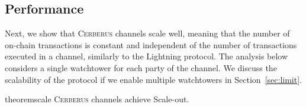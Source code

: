 \documentclass[runningheads]{llncs}
\newcommand{\sys}{\textsc{Cerberus}\xspace}
\begin{document}
\subsection{Performance}

Next, we show that \sys channels scale well, meaning that the number of on-chain transactions is constant and independent of the number of transactions executed in a channel, similarly to the Lightning protocol. The analysis below considers a single watchtower for each party of the channel. We discuss the scalability of the protocol if we enable multiple watchtowers in Section~\ref{sec:limit}.

\vspace{-4pt}
\begin{restatable}{theorem}{scale}
\sys channels achieve Scale-out.
\end{restatable}



\end{document}
